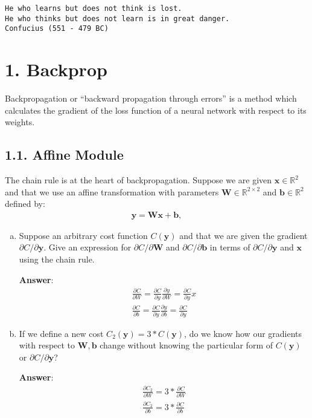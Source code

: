 \documentclass[12pt,letterpaper]{article}
\newcommand{\matr}[1]{\bm{#1}}     %
\newcommand{\vect}[1]{\bm{#1}}     %
\begin{document}
\begin{center}
\texttt{He who learns but does not think is lost. \\He who thinks but does not learn is in great danger. \\ Confucius (551 - 479 BC)}

\end{center}

\section*{1. Backprop}

Backpropagation or ``backward propagation through errors'' is a method which calculates the gradient of the loss function of a neural network with respect to its weights. 

\subsection*{1.1. Affine Module}
The chain rule is at the heart of backpropagation. Suppose we are given $\vect{x} \in \mathbb{R}^2$ and that we use an affine transformation with parameters
$\matr{W} \in \mathbb{R}^{2\times 2}$ and $\vect{b}\in \mathbb{R}^2$ defined by:
\begin{align}
\vect{y} = \matr{W} \vect{x} + \vect{b},
\end{align}
\begin{enumerate}[(a)]
    \item Suppose an arbitrary cost function $C(\vect{y})$ and that we are given the gradient $\partial C / \partial \vect{y}$. Give an expression for $ \partial C / \partial \matr{W}$ and $ \partial C / \partial \vect{b}$ in terms of $ \partial C / \partial \vect{y}$ and $\vect{x}$ using the chain rule.
    
    \textbf{Answer}:
    \begin{align}
    \frac{\partial C}{\partial W} = \frac{\partial C}{\partial y}\frac{\partial y}{\partial W} = \frac{\partial C}{\partial y}x \\
    \frac{\partial C}{\partial b} = \frac{\partial C}{\partial y}\frac{\partial y}{\partial b} = \frac{\partial C}{\partial y}
    \end{align}
    
    \item If we define a new cost $C_2(\vect{y}) = 3*C(\vect{y})$, do we know how our gradients with respect to $\vect{W,b}$ change without knowing the particular form of $C(\vect{y})$ or $ \partial C / \partial \vect{y}$?
    
    \textbf{Answer}:
    \begin{align}
    \frac{\partial C_2}{\partial W} = 3*\frac{\partial C}{\partial W}\\
    \frac{\partial C_2}{\partial b} = 3*\frac{\partial C}{\partial b}
    \end{align}
    
    
\end{enumerate}
\end{document}
